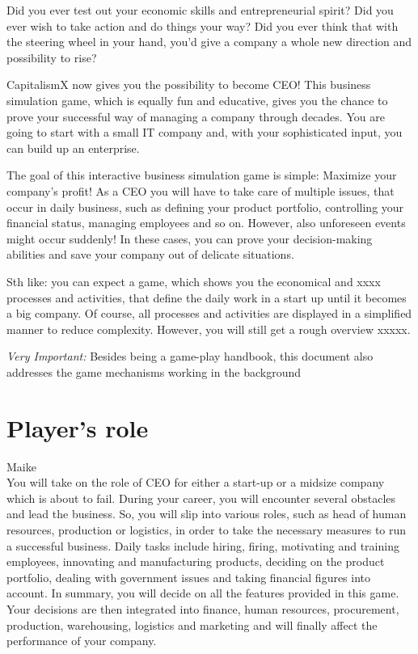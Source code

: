\documentclass[11pt,titlepage,oneside,openany]{book}
\begin{document}
Did you ever test out your economic skills and entrepreneurial spirit? Did you ever wish to take action and do things your way? Did you ever think that with the steering wheel in your hand, you'd give a company a whole new direction and possibility to rise? 

CapitalismX now gives you the possibility to become CEO! This business simulation game, which is equally fun and educative, gives you the chance to prove your successful way of managing a company through decades. You are going to start with a small IT company and, with your sophisticated input, you can build up an enterprise.

The goal of this interactive business simulation game is simple: Maximize your company's profit! As a CEO you will have to take care of multiple issues, that occur in daily business, such as defining your product portfolio, controlling your financial status, managing employees and so on. However, also unforeseen events might occur suddenly! In these cases, you can prove your decision-making abilities and save your company out of delicate situations. 

Sth like: you can expect a game, which shows you the economical and xxxx processes and activities, that define the daily work in a start up until it becomes a big company. Of course, all processes and activities are displayed in a simplified manner to reduce complexity. However, you will still get a rough overview xxxxx.

\emph{Very Important:} Besides being a game-play handbook, this document also addresses the game mechanisms working in the background
 
\section{Player's role}
Maike\\
You will take on the role of CEO for either a start-up or a midsize company which is about to fail. During your career, you will encounter several obstacles and lead the business. So, you will slip into various roles, such as head of human resources, production or logistics, in order to take the necessary measures to run a successful business. Daily tasks include hiring, firing, motivating and training employees, innovating and manufacturing products, deciding on the product portfolio, dealing with government issues and taking financial figures into account. In summary, you will decide on all the features provided in this game. Your decisions are then integrated into finance, human resources, procurement, production, warehousing, logistics and marketing and will finally affect the performance of your company.
\end{document}
